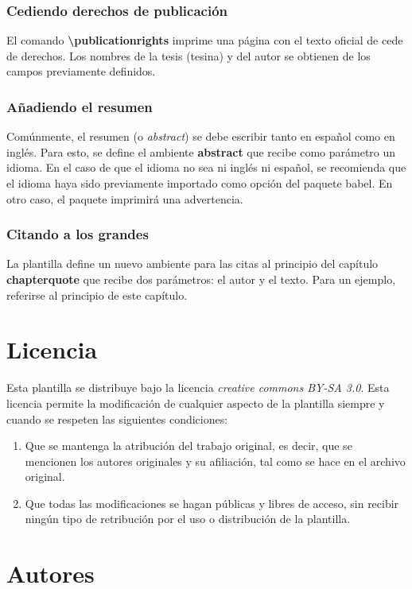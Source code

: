 \subsubsection{Cediendo derechos de publicación}
El comando \textbf{\textbackslash publicationrights} imprime una página con el texto oficial de cede de derechos. Los nombres de la tesis (tesina) y del autor se obtienen de los campos previamente definidos.

\subsubsection{Añadiendo el resumen}
Comúnmente, el resumen (o \emph{abstract}) se debe escribir tanto en español como en inglés. Para esto, se define el ambiente \textbf{abstract} que recibe como parámetro un idioma. En el caso de que el idioma no sea ni inglés ni español, se recomienda que el idioma haya sido previamente importado como opción del paquete babel. En otro caso, el paquete imprimirá una advertencia. 

\subsubsection{Citando a los grandes}
La plantilla define un nuevo ambiente para las citas al principio del capítulo \textbf{chapterquote} que recibe dos parámetros: el autor y el texto. Para un ejemplo, referirse al principio de este capítulo.


\section{Licencia}
Esta plantilla se distribuye bajo la licencia \emph{creative commons BY-SA 3.0}. Esta licencia permite la modificación de cualquier aspecto de la plantilla siempre y cuando se respeten las siguientes condiciones:
\begin{enumerate}
	\item Que se mantenga la atribución del trabajo original, es decir, que se mencionen los autores originales y su afiliación, tal como se hace en el archivo original.
	\item Que todas las modificaciones se hagan públicas y libres de acceso, sin recibir ningún tipo de retribución por el uso o distribución de la plantilla.
\end{enumerate}

\section{Autores}
